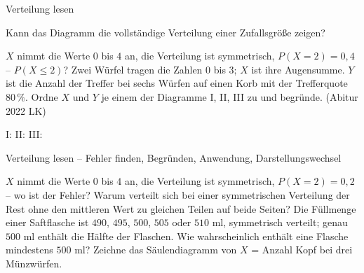 \setcounter{aufgabe}{8}

\begin{aufgabe}{Verteilung lesen}
\begin{teile}
\teil Kann das Diagramm die vollständige Verteilung einer Zufallsgröße zeigen? \\ 

\teil $X$ nimmt die Werte $0$ bis $4$ an, die Verteilung ist symmetrisch, $P(X = 2) = 0{,}4$ – $P(X \le 2)$?
\teil Zwei Würfel tragen die Zahlen $0$ bis $3$; $X$ ist ihre Augensumme. $Y$ ist die Anzahl der Treffer bei sechs Würfen auf einen Korb mit der Trefferquote $80\,\%$. Ordne $X$ und $Y$ je einem der Diagramme I, II, III zu und begründe. \hfill (Abitur 2022 LK)

I:  \quad II:  \quad III: 
\end{teile}
\end{aufgabe}

\begin{aufgabe}{Verteilung lesen – Fehler finden, Begründen, Anwendung, Darstellungswechsel}
\begin{teile}
\teil $X$ nimmt die Werte $0$ bis $4$ an, die Verteilung ist symmetrisch, $P(X = 2) = 0{,}2$ – wo ist der Fehler? 
\teil Warum verteilt sich bei einer symmetrischen Verteilung der Rest ohne den mittleren Wert zu gleichen Teilen auf beide Seiten?
\teil Die Füllmenge einer Saftflasche ist $490$, $495$, $500$, $505$ oder $510$ ml, symmetrisch verteilt; genau $500$ ml enthält die Hälfte der Flaschen. Wie wahrscheinlich enthält eine Flasche mindestens $500$ ml?
\teil Zeichne das Säulendiagramm von $X$ = Anzahl Kopf bei drei Münzwürfen.

\end{teile}
\end{aufgabe}
